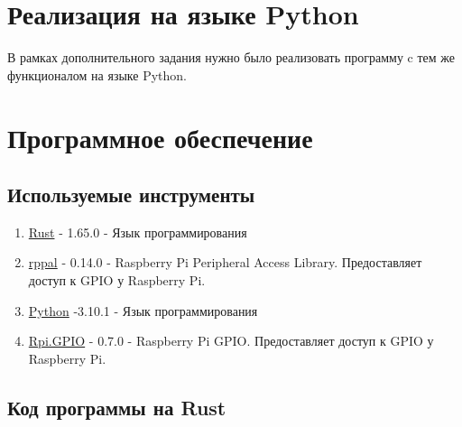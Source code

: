 \documentclass[a4paper,12pt]{article}
\begin{document}
\newpage

\section{Реализация на языке Python}
В рамках дополнительного задания нужно было реализовать программу c тем же функционалом на языке Python.
\newpage

\section{Программное обеспечение}
\subsection{Используемые инструменты}
\begin{enumerate}
  \item \href{https://www.rust-lang.org/}{Rust} - 1.65.0 - Язык программирования
  \item \href{https://github.com/golemparts/rppal}{rppal} - 0.14.0 - Raspberry Pi Peripheral Access Library. Предоставляет
  доступ к GPIO у Raspberry Pi.
  \item \href{https://www.python.org/}{Python} -3.10.1 - Язык программирования
  \item \href{https://sourceforge.net/projects/raspberry-gpio-python/}{Rpi.GPIO} - 0.7.0 - Raspberry Pi GPIO. Предоставляет доступ к GPIO у Raspberry Pi.
\end{enumerate}

\subsection{Код программы на Rust}







\end{document}
